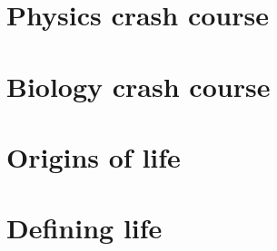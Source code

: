 \documentclass[DIV=calc, paper=a4, fontsize=12pt]{scrartcl}	 %
\begin{document}
\section{Physics crash course}

\begin{multicols}{2}







\end{multicols}


\section{Biology crash course}

\begin{multicols}{2}



\end{multicols}


\section{Origins of life}

\begin{multicols}{2}





\end{multicols}


\section{Defining life}

\begin{multicols}{2}



\end{multicols}
\end{document}
